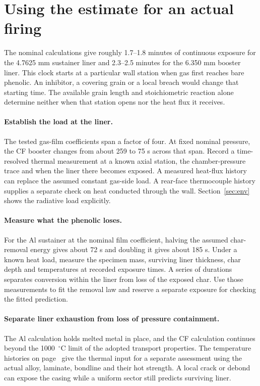 \section{Using the estimate for an actual firing}\label{sec:interpretation}
The nominal calculations give roughly 1.7--1.8 minutes of continuous
exposure for the 4.7625 mm sustainer liner and 2.3--2.5 minutes for the
6.350 mm booster liner. This clock starts at a particular wall station
when gas first reaches bare phenolic. An inhibitor, a covering grain or a
local breach would change that starting time. The available grain length and
stoichiometric reaction alone determine neither when that station opens nor
the heat flux it receives.

\paragraph{Establish the load at the liner.}
The tested gas-film coefficients span a factor of four. At fixed nominal
pressure, the CF booster changes from about 259 to 75 s across that span.
Record a time-resolved thermal measurement at a known axial station,
the chamber-pressure trace and when the liner there becomes exposed.
A measured heat-flux history can replace the assumed constant gas-side load.
A rear-face thermocouple history supplies a separate check on heat conducted
through the wall. Section~\ref{sec:env} shows the radiative load explicitly.

\paragraph{Measure what the phenolic loses.}
For the Al sustainer at the nominal film coefficient, halving the assumed
char-removal energy gives about 72 s and doubling it gives about 185 s.
Under a known heat load, measure the specimen mass, surviving liner thickness,
char depth and temperatures at recorded exposure times. A series of durations
separates conversion within the liner from loss of the exposed char.
Use those measurements to fit the removal law and reserve a separate exposure
for checking the fitted prediction.

\paragraph{Separate liner exhaustion from loss of pressure containment.}
The Al calculation holds melted metal in place, and the CF calculation
continues beyond the 1000~$^\circ$C limit of the adopted transport properties.
The temperature histories on page~\pageref{sec:temperatures} give the
thermal input for a separate assessment using the actual alloy, laminate,
bondline and their hot strength. A local crack or debond can expose the casing
while a uniform sector still predicts surviving liner.

